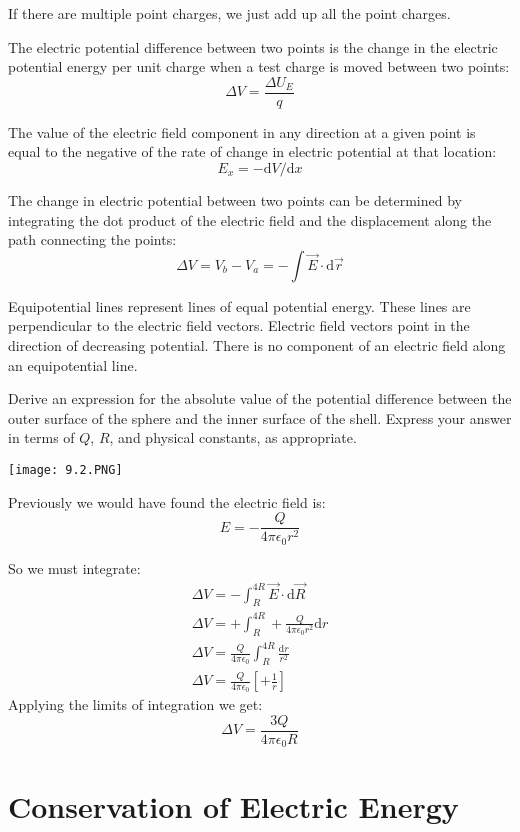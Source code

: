 \documentclass[../em.tex]{subfiles}
\begin{document}
If there are multiple point charges, we just add up all the point charges.

The electric potential difference between two points is the change in the electric potential energy
per unit charge when a test charge is moved between two points:
\[\Delta{V}=\frac{\Delta{U_E}}{q}\]

The value of the electric field component in any direction at a given point is equal to the 
negative of the rate of change in electric potential at that location:
\[E_x=-\mathrm{d}V/\mathrm{d}x\]

The change in electric potential between two points can be determined by integrating the dot product
of the electric field and the displacement along the path connecting the points:
\[\Delta{V}=V_b-V_a=-\int{\vec{E}\cdot\mathrm{d}\vec{r}}\]

Equipotential lines represent lines of equal potential energy. These lines are perpendicular to the electric field vectors.
Electric field vectors point in the direction of decreasing potential. There is no component of an electric field along an equipotential line.

\begin{example}
    Derive an expression for the absolute value of the potential difference between the outer surface
    of the sphere and the inner surface of the shell. Express your answer in terms of $Q$, $R$, and physical constants,
    as appropriate.

    \begin{center}
        \texttt{[image: 9.2.PNG]}
    \end{center}

    Previously we would have found the electric field is:
    \[E=-\frac{Q}{4\pi\epsilon_0r^2}\]

    So we must integrate:
    \begin{align*}
    \Delta V=-\int_R^{4R}\vec{E}\cdot\mathrm{d}\vec{R} \\
    \Delta V = +\int_R^{4R}+\frac{Q}{4\pi\epsilon_0 r^2}\mathrm{d}r\\
    \Delta V = \frac{Q}{4\pi\epsilon_0}\int_R^{4R}\frac{\mathrm{d}r}{r^2}\\
    \Delta V = \frac{Q}{4\pi\epsilon_0}\left[+\frac{1}{r}\right]
    \end{align*}
    Applying the limits of integration we get: 
    \[\Delta V = \frac{3Q}{4\pi\epsilon_0 R}\]
\end{example}

\section{Conservation of Electric Energy}
\end{document}
